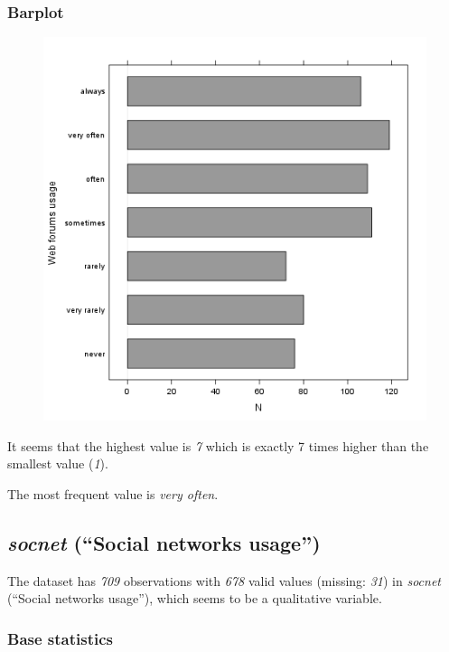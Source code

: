 \documentclass[]{article}
\makeatletter
\def\maxwidth{\ifdim\Gin@nat@width>\linewidth\linewidth
\else\Gin@nat@width\fi}
\let\Oldincludegraphics\includegraphics
\renewcommand{\includegraphics}[1]{\Oldincludegraphics[width=\maxwidth]{#1}}
\makeatother
\begin{document}
\subsubsection{Barplot}

\begin{figure}[htbp]
\centering
\includegraphics{ac419134b2f4695e544d8886ba12e0c2.png}
\caption{}
\end{figure}

It seems that the highest value is \emph{7} which is exactly 7 times
higher than the smallest value (\emph{1}).

The most frequent value is \emph{very often}.

\subsection{\emph{socnet} (``Social networks usage'')}

The dataset has \emph{709} observations with \emph{678} valid values
(missing: \emph{31}) in \emph{socnet} (``Social networks usage''), which
seems to be a qualitative variable.

\subsubsection{Base statistics}
\end{document}
